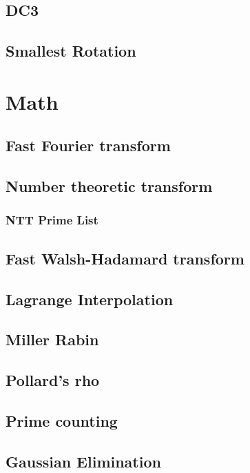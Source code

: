 \documentclass[a4paper,10pt,twocolumn,oneside]{article}
\begin{document}
\subsection{DC3}

\subsection{Smallest Rotation}

\section{Math}
\subsection{Fast Fourier transform}

\subsection{Number theoretic transform}

\subsubsection{NTT Prime List}

\subsection{Fast Walsh-Hadamard transform}

\subsection{Lagrange Interpolation}

\subsection{Miller Rabin}

\subsection{Pollard's rho}

\subsection{Prime counting}

\subsection{Gaussian Elimination}

\end{document}
